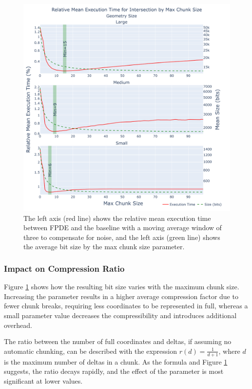 \begin{figure}[htbp]
    \centering
        \includegraphics[width=15.5cm]{images/chunk_max_size.png}
    \caption{The left axis (red line) shows the relative mean execution time between FPDE and the baseline with a moving average window of three to compensate for noise, and the left axis (green line) shows the average bit size by the max chunk size parameter.}
    \label{img:delta_max_chunk_perf}
\end{figure}

\subsubsection{Impact on Compression Ratio}
Figure \ref{img:delta_max_chunk_perf} shows how the resulting bit size varies with the maximum chunk size. Increasing the parameter results in a higher average compression factor due to fewer chunk breaks, requiring less coordinates to be represented in full, whereas a small parameter value decreases the compressibility and introduces additional overhead.

The ratio between the number of full coordinates and deltas, if assuming no automatic chunking, can be described with the expression \(r(d) = \frac{1}{d + 1}\), where \(d\) is the maximum number of deltas in a chunk. As the formula and Figure \ref{img:delta_max_chunk_perf} suggests, the ratio decays rapidly, and the effect of the parameter is most significant at lower values.

